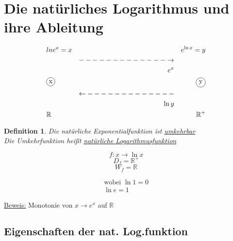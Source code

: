 \documentclass{scrbook}
\newcommand*\circled[1]{\tikz[baseline=(char.base)]{
            \node[shape=circle,draw,inner sep=2pt] (char) {#1};}}
\newtheorem{definition}{Definition}
\begin{document}
\section{Die natürliches Logarithmus und ihre Ableitung}


\begin{align*}
&ln e^x = x &&& e^{\ln x} = y
\\
&&-------------\rightarrow 
\\
&&e^x 
\\
&\circled x &&& \circled y
\\
&& \leftarrow -------------
\\
&& \ln y 
\\
&\mathbb{R} &&& \mathbb{R}^+
\end{align*}


\begin{definition} 
Die natürliche Exponentialfunktion ist \underline{umkehrbar} \\
Die Umkehrfunktion heißt \underline{natürliche Logarithmusfunktion}

\[f: x \rightarrow \ln x \]
\[ D_f = \mathbb{R}^+\]
\[ W_f = \mathbb{R}\]

\begin{align*}
\text{wobei } \ln 1 = 0
\\
 \ln e = 1
\end{align*}

\end{definition}

\underline{Beweis:} Monotonie von $ x \rightarrow e^x$ auf $\mathbb{R}$

\subsection{Eigenschaften der nat. Log.funktion}

\end{document}
